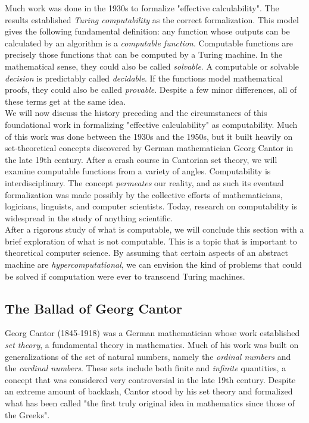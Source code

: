 Much work was done in the 1930s to formalize "effective calculability". The results established \textit{Turing computability} as the correct formalization. This model gives the following fundamental definition: any function whose outputs can be calculated by an algorithm is a \textit{computable function}. Computable functions are precisely those functions that can be computed by a Turing machine. In the mathematical sense, they could also be called \textit{solvable}. A computable or solvable \textit{decision} is predictably called \textit{decidable}. If the functions model mathematical proofs, they could also be called \textit{provable}. Despite a few minor differences, all of these terms get at the same idea. \\

We will now discuss the history preceding and the circumstances of this foundational work in formalizing "effective calculability" as computability. Much of this work was done between the 1930s and the 1950s, but it built heavily on set-theoretical concepts discovered by German mathematician Georg Cantor in the late 19th century. After a crash course in Cantorian set theory, we will examine computable functions from a variety of angles. Computability is interdisciplinary. The concept \textit{permeates} our reality, and as such its eventual formalization was made possibly by the collective efforts of mathematicians, logicians, linguists, and computer scientists. Today, research on computability is widespread in the study of anything scientific. \\

After a rigorous study of what is computable, we will conclude this section with a brief exploration of what is not computable. This is a topic that is important to theoretical computer science. By assuming that certain aspects of an abstract machine are \textit{hypercomputational}, we can envision the kind of problems that could be solved if computation were ever to transcend Turing machines. \\


\subsection{The Ballad of Georg Cantor}

Georg Cantor (1845-1918) was a German mathematician whose work established \textit{set theory}, a fundamental theory in mathematics. Much of his work was built on generalizations of the set of natural numbers, namely the \textit{ordinal numbers} and the \textit{cardinal numbers}. These sets include both finite and \textit{infinite} quantities, a concept that was considered very controversial in the late 19th century. Despite an extreme amount of backlash, Cantor stood by his set theory and formalized what has been called "the first truly original idea in mathematics since those of the Greeks". \\

